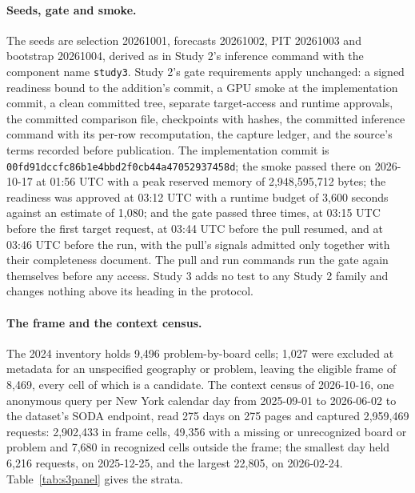 \paragraph{Seeds, gate and smoke.} The seeds are selection 20261001, forecasts 20261002, PIT 20261003 and
bootstrap 20261004, derived as in Study 2's inference command with the component name \texttt{study3}.
Study 2's gate requirements apply unchanged: a signed readiness bound to the addition's commit, a GPU smoke
at the implementation commit, a clean committed tree, separate target-access and runtime approvals, the
committed comparison file, checkpoints with hashes, the committed inference command with its per-row
recomputation, the capture ledger, and the source's terms recorded before publication. The implementation
commit is \texttt{00fd91dccfc86b1e4bbd2f0cb44a47052937458d}; the smoke passed there on 2026-10-17 at 01:56
UTC with a peak reserved memory of 2,948,595,712 bytes; the readiness was approved at 03:12 UTC with a
runtime budget of 3,600 seconds against an estimate of 1,080; and the gate passed three times, at 03:15 UTC
before the first target request, at 03:44 UTC before the pull resumed, and at 03:46 UTC before the run, with
the pull's signals admitted only together with their completeness document. The pull and run commands run
the gate again themselves before any access. Study 3 adds no test to any Study 2 family and changes nothing
above its heading in the protocol.

\paragraph{The frame and the context census.} The 2024 inventory holds 9,496 problem-by-board cells;
1,027 were excluded at metadata for an unspecified geography or problem, leaving the eligible frame of
8,469, every cell of which is a candidate. The context census of 2026-10-16, one anonymous query per New
York calendar day from 2025-09-01 to 2026-06-02 to the dataset's SODA endpoint, read 275 days on 275 pages
and captured 2,959,469 requests: 2,902,433 in frame cells, 49,356 with a missing or unrecognized board or
problem and 7,680 in recognized cells outside the frame; the smallest day held 6,216 requests, on
2025-12-25, and the largest 22,805, on 2026-02-24. Table~\ref{tab:s3panel} gives the strata.

